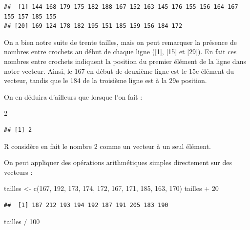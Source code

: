 \documentclass[
]{book}
\newenvironment{Shaded}{\begin{snugshade}}{\end{snugshade}}
\newcommand{\DecValTok}[1]{\textcolor[rgb]{0.00,0.00,0.81}{#1}}
\newcommand{\FunctionTok}[1]{\textcolor[rgb]{0.00,0.00,0.00}{#1}}
\newcommand{\NormalTok}[1]{#1}
\newcommand{\OtherTok}[1]{\textcolor[rgb]{0.56,0.35,0.01}{#1}}
\newcommand{\SpecialCharTok}[1]{\textcolor[rgb]{0.00,0.00,0.00}{#1}}
\begin{document}
\begin{verbatim}
##  [1] 144 168 179 175 182 188 167 152 163 145 176 155 156 164 167 155 157 185 155
## [20] 169 124 178 182 195 151 185 159 156 184 172
\end{verbatim}

On a bien notre suite de trente tailles, mais on peut remarquer la présence de nombres entre crochets au début de chaque ligne ({[}1{]}, {[}15{]} et {[}29{]}). En fait ces nombres entre crochets indiquent la position du premier élément de la ligne dans notre vecteur. Ainsi, le 167 en début de deuxième ligne est le 15e élément du vecteur, tandis que le 184 de la troisième ligne est à la 29e position.

On en déduira d'ailleurs que lorsque l'on fait :

\begin{Shaded}
\begin{Highlighting}[]
\DecValTok{2}
\end{Highlighting}
\end{Shaded}

\begin{verbatim}
## [1] 2
\end{verbatim}

R considère en fait le nombre 2 comme un vecteur à un seul élément.

On peut appliquer des opérations arithmétiques simples directement sur des vecteurs :

\begin{Shaded}
\begin{Highlighting}[]
\NormalTok{tailles }\OtherTok{\textless{}{-}} \FunctionTok{c}\NormalTok{(}\DecValTok{167}\NormalTok{, }\DecValTok{192}\NormalTok{, }\DecValTok{173}\NormalTok{, }\DecValTok{174}\NormalTok{, }\DecValTok{172}\NormalTok{, }\DecValTok{167}\NormalTok{, }\DecValTok{171}\NormalTok{, }\DecValTok{185}\NormalTok{, }\DecValTok{163}\NormalTok{, }\DecValTok{170}\NormalTok{)}
\NormalTok{tailles }\SpecialCharTok{+} \DecValTok{20}
\end{Highlighting}
\end{Shaded}

\begin{verbatim}
##  [1] 187 212 193 194 192 187 191 205 183 190
\end{verbatim}

\begin{Shaded}
\begin{Highlighting}[]
\NormalTok{tailles }\SpecialCharTok{/} \DecValTok{100}
\end{Highlighting}
\end{Shaded}
\end{document}
